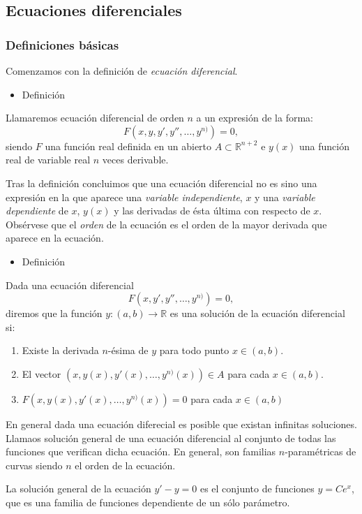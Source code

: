\subsection{Ecuaciones diferenciales}
\subsubsection{Definiciones básicas}
Comenzamos con la definición de \textit{ecuación diferencial}.
\begin{itemize}[label=\color{red}\textbullet, leftmargin=*]
	\item \color{lightblue}Definición
\end{itemize}
Llamaremos ecuación diferencial de orden $n$ a un expresión de la forma:
$$
F(x,y,y',y'',\dots,y^{n)})=0,
$$
siendo $F$ una función real definida en un abierto $A\subset \mathbb{R}^{n+2}$ e $y(x)$ una función real de variable real $n$ veces derivable.

Tras la definición concluimos que una ecuación diferencial no es sino una expresión en la que aparece una \textit{variable independiente}, $x$ y una \textit{variable dependiente} de $x$, $y(x)$ y las derivadas de ésta última con respecto de $x$. Obsérvese que el \textit{orden} de la ecuación es el orden de la mayor derivada que aparece en la ecuación.
\begin{itemize}[label=\color{red}\textbullet, leftmargin=*]
	\item \color{lightblue}Definición
\end{itemize}
Dada una ecuación diferencial
$$
F(x,y',y'',\dots,y^{n)})=0,
$$
diremos que la función $y:(a,b)\longrightarrow\mathbb{R}$ es una solución de la ecuación diferencial si:
\begin{enumerate}[label=\arabic*)]
\item Existe la derivada $n$-ésima de $y$ para todo punto $x\in(a,b)$.
\item El vector $(x,y(x),y'(x),\dots,y^{n)}(x))\in A$ para cada $x\in(a,b)$.
\item $F(x,y(x),y'(x),\dots,y^{n)}(x))=0$ para cada $x\in(a,b)$
\end{enumerate}
En general dada una ecuación diferecial es posible que existan infinitas soluciones. Llamaos solución general de una ecuación diferencial al conjunto de todas las funciones que verifican dicha ecuación. En general, son familias $n$-paramétricas de curvas siendo $n$ el orden de la ecuación.


La solución general de la ecuación $y'-y=0$ es el conjunto de funciones $y=Ce^{x}$, que es una familia de funciones dependiente de un sólo parámetro.

